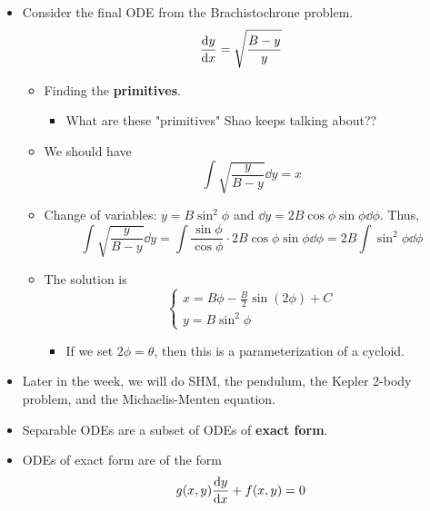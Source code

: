 \documentclass[../notes.tex]{subfiles}
\begin{document}
\begin{itemize}
    \item Consider the final ODE from the Brachistochrone problem.
    \begin{equation*}
        \dv{y}{x} = \sqrt{\frac{B-y}{y}}
    \end{equation*}
    \begin{itemize}
        \item Finding the \textbf{primitives}.
        \begin{itemize}
            \item What are these "primitives" Shao keeps talking about??
        \end{itemize}
        \item We should have
        \begin{equation*}
            \int\sqrt{\frac{y}{B-y}}\dd{y} = x
        \end{equation*}
        \item Change of variables: $y=B\sin^2\phi$ and $\dd{y}=2B\cos\phi\sin\phi\dd{\phi}$. Thus,
        \begin{equation*}
            \int\sqrt{\frac{y}{B-y}}\dd{y} = \int\frac{\sin\phi}{\cos\phi}\cdot 2B\cos\phi\sin\phi\dd{\phi}
            = 2B\int\sin^2\phi\dd{\phi}
        \end{equation*}
        \item The solution is
        \begin{equation*}
            \begin{cases}
                x = B\phi-\frac{B}{2}\sin(2\phi)+C\\
                y = B\sin^2\phi
            \end{cases}
        \end{equation*}
        \begin{itemize}
            \item If we set $2\phi=\theta$, then this is a parameterization of a cycloid.
        \end{itemize}
    \end{itemize}
    \item Later in the week, we will do SHM, the pendulum, the Kepler 2-body problem, and the Michaelis-Menten equation.
    \item Separable ODEs are a subset of ODEs of \textbf{exact form}.
    \item ODEs of exact form are of the form
    \begin{equation*}
        g(x,y)\dv{y}{x}+f(x,y) = 0
    \end{equation*}

\end{itemize}
\end{document}
